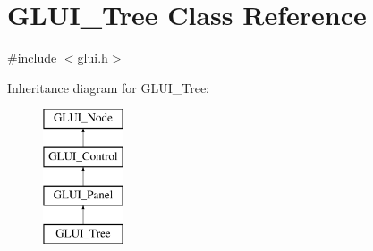 \hypertarget{classGLUI__Tree}{\section{G\-L\-U\-I\-\_\-\-Tree Class Reference}
\label{classGLUI__Tree}
}


{\ttfamily \#include $<$glui.\-h$>$}

Inheritance diagram for G\-L\-U\-I\-\_\-\-Tree\-:\begin{figure}[H]
\begin{center}
\leavevmode
\includegraphics[height=4.000000cm]{classGLUI__Tree}
\end{center}
\end{figure}
